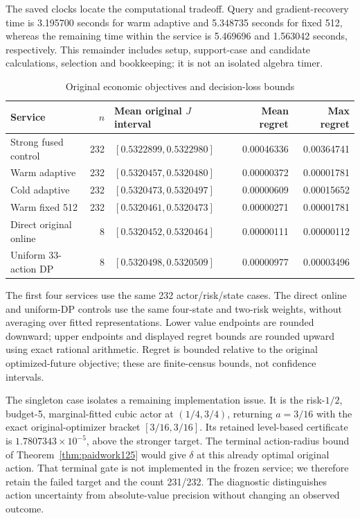 The saved clocks locate the computational tradeoff. Query and gradient-recovery time is 3.195700 seconds for warm adaptive and 5.348735 seconds for fixed 512, whereas the remaining time within the service is 5.469696 and 1.563042 seconds, respectively. This remainder includes setup, support-case and candidate calculations, selection and bookkeeping; it is not an isolated algebra timer.
\begin{table}[t]
\centering\small
\caption{Original economic objectives and decision-loss bounds}
\label{tab:economics125}
\begin{tabular}{lrlrr}
\hline
Service & $n$ & Mean original $J$ interval & Mean regret & Max regret \\
\hline
Strong fused control & 232 & $[0.5322899,0.5322980]$ & 0.00046336 & 0.00364741 \\
Warm adaptive & 232 & $[0.5320457,0.5320480]$ & 0.00000372 & 0.00001781 \\
Cold adaptive & 232 & $[0.5320473,0.5320497]$ & 0.00000609 & 0.00015652 \\
Warm fixed 512 & 232 & $[0.5320461,0.5320473]$ & 0.00000271 & 0.00001781 \\
Direct original online & 8 & $[0.5320452,0.5320464]$ & 0.00000111 & 0.00000112 \\
Uniform 33-action DP & 8 & $[0.5320498,0.5320509]$ & 0.00000977 & 0.00003496 \\
\hline\end{tabular}
\par\smallskip\parbox{0.96\textwidth}{\footnotesize The first four services use the same 232 actor/risk/state cases. The direct online and uniform-DP controls use the same four-state and two-risk weights, without averaging over fitted representations. Lower value endpoints are rounded downward; upper endpoints and displayed regret bounds are rounded upward using exact rational arithmetic. Regret is bounded relative to the original optimized-future objective; these are finite-census bounds, not confidence intervals.}
\end{table}
The singleton case isolates a remaining implementation issue. It is the risk-$1/2$, budget-5, marginal-fitted cubic actor at $(1/4,3/4)$, returning $a=3/16$ with the exact original-optimizer bracket $[3/16,3/16]$. Its retained level-based certificate is $1.7807343\times10^{-5}$, above the stronger target. The terminal action-radius bound of Theorem~\ref{thm:paidwork125} would give $\delta$ at this already optimal original action. That terminal gate is not implemented in the frozen service; we therefore retain the failed target and the count 231/232. The diagnostic distinguishes action uncertainty from absolute-value precision without changing an observed outcome.
